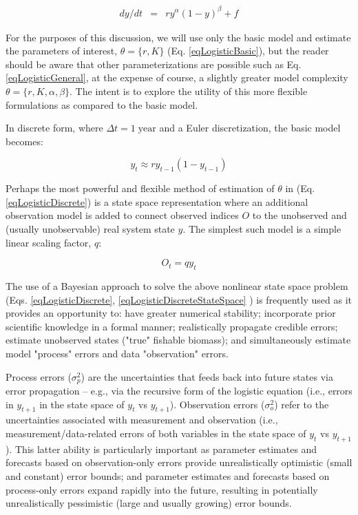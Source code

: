 \documentclass[letterpaper,portrait,11pt]{scrartcl}
\numberwithin{equation}{section}		%
\numberwithin{figure}{section}		%
\numberwithin{table}{section}				%
\begin{document}
\begin{eqnarray} 
\label{eqLogisticGeneral}
dy / dt &=& r y^{\alpha} ( 1 - y )^{\beta} + f 
\end{eqnarray}

For the purposes of this discussion, we will use only the basic model and estimate the parameters of interest, $\theta = \{r, K \}$ (Eq. \ref{eqLogisticBasic}), but the reader should be aware that other parameterizations are possible such as Eq. \ref{eqLogisticGeneral}, at the expense of course, a slightly greater model complexity $\theta=\{r,K,\alpha,\beta\}$. The intent is to explore the utility of this more flexible formulations as compared to the basic model. 

In discrete form, where $\Delta t = 1 \; \text{year}$ and a Euler discretization, the basic model becomes:

\begin{equation} 
\label{eqLogisticDiscrete}
y_t  \approx r y_{t-1} (1 - y_{t-1} )
\end{equation}

Perhaps the most powerful and flexible method of estimation of $\theta$ in (Eq. \ref{eqLogisticDiscrete}) is a state space representation where an additional observation model is added to connect observed indices $O$ to the unobserved and (usually unobservable) real system state $y$. The simplest such model is a simple linear scaling factor, $q$: 

\begin{equation} 
\label{eqLogisticDiscreteStateSpace}
O_t = q y_t
\end{equation}


The use of a Bayesian approach to solve the above nonlinear state space problem (Eqs. \ref{eqLogisticDiscrete}, \ref{eqLogisticDiscreteStateSpace} ) is frequently used as it provides an opportunity to: have greater numerical stability;  incorporate prior scientific knowledge in a formal manner; realistically propagate credible errors; estimate unobserved states ("true" fishable biomass); and simultaneously estimate model "process" errors and data "observation" errors. 

Process errors ($\sigma^2_p$) are the uncertainties that feeds back into future states via error propagation -- e.g., via the recursive form of the logistic equation (i.e., errors in $y_{t+1}$ in the state space of $y_t$ vs $y_{t+1}$). Observation errors ($\sigma^2_o$) refer to the uncertainties associated with measurement and observation (i.e., measurement/data-related errors of both variables in the state space of $y_t$ vs $y_{t+1}$). This latter ability is particularly important as parameter estimates and forecasts based on observation-only errors provide unrealistically optimistic (small and constant) error bounds; and parameter estimates and forecasts based on process-only errors expand rapidly into the future, resulting in potentially unrealistically pessimistic (large and usually growing) error bounds.
\end{document}
